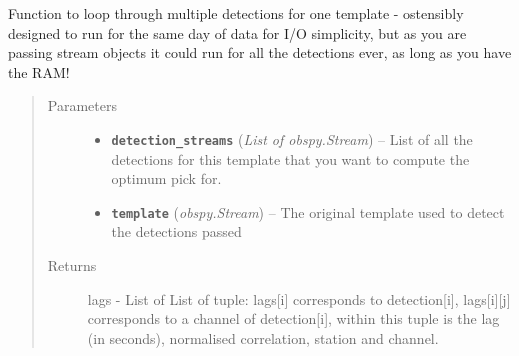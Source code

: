 \documentclass[a4paper,10pt,english]{sphinxmanual}
\begin{document}

\begin{fulllineitems}
\label{submodules/core.lag_calc:lag_calc.day_loop}
Function to loop through multiple detections for one template - ostensibly
designed to run for the same day of data for I/O simplicity, but as you
are passing stream objects it could run for all the detections ever, as long
as you have the RAM!
\begin{quote}\begin{description}
\item[{Parameters}] \leavevmode\begin{itemize}
\item {} 
\textbf{\texttt{detection\_streams}} (\emph{List of obspy.Stream}) -- List of all the detections for this template that you
want to compute the optimum pick for.

\item {} 
\textbf{\texttt{template}} (\emph{obspy.Stream}) -- The original template used to detect the detections passed

\end{itemize}

\item[{Returns}] \leavevmode
lags - List of List of tuple: lags{[}i{]} corresponds to detection{[}i{]},
lags{[}i{]}{[}j{]} corresponds to a channel of detection{[}i{]}, within
this tuple is the lag (in seconds), normalised correlation,
station and channel.

\end{description}\end{quote}

\end{fulllineitems}

\end{document}
